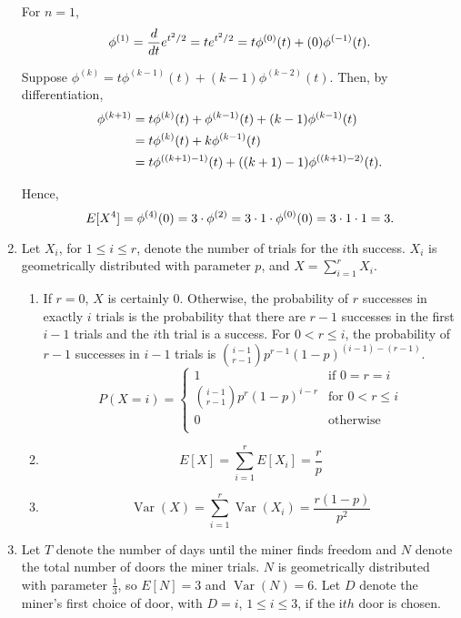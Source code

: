 \documentclass{article}
\DeclareMathOperator{\Var}{Var}
\begin{document}
\begin{enumerate}
    For $n=1$,
    \[
    \phi^{(1)} = \frac{d}{dt}e^{t^2/2} = te^{t^2/2} = t\phi^{(0)}(t) + (0)\phi^{(-1)}(t) \text.
    \]

    Suppose $\phi^{(k)} = t\phi^{(k-1)}(t) + (k-1)\phi^{(k-2)}(t)$. Then, by differentiation,
    \[\begin{split}
    \phi^{(k+1)}    & = t\phi^{(k)}(t) + \phi^{(k-1)}(t) + (k-1)\phi^{(k-1)}(t) \\
                    & = t\phi^{(k)}(t) + k\phi^{(k-1)}(t) \\
                    & = t\phi^{((k+1)-1)}(t) + ((k+1)-1)\phi^{((k+1)-2)}(t) \text. \\
    \end{split}\]

    Hence,
    \[
    E[X^4] = \phi^{(4)}(0) = 3\cdot\phi^{(2)} = 3\cdot1\cdot\phi^{(0)}(0) = 3\cdot1\cdot1 = 3 \text.
    \]
\item
    Let $X_i$, for $1 \leq i \leq r$, denote the number of trials for the $i$th success.
    $X_i$ is geometrically distributed with parameter $p$, and $X=\sum_{i=1}^r X_i$.
    \begin{enumerate}
    \item
        If $r=0$, $X$ is certainly $0$.
        Otherwise, the probability of $r$ successes in exactly $i$ trials is the probability that there are $r-1$ successes in the first $i-1$ trials and the $i$th trial is a success.
        For $0 < r \leq i$, the probability of $r-1$ successes in $i-1$ trials is $\binom{i-1}{r-1}p^{r-1}(1-p)^{(i-1)-(r-1)}$.
        \[
        P(X=i) =
        \begin{cases}
            1                               & \text{if } 0 = r = i \\
            \binom{i-1}{r-1}p^r(1-p)^{i-r}  & \text{for } 0 < r \leq i \\
            0                               & \text{otherwise} \\
        \end{cases}
        \]
    \item
        \[
        E[X] = \sum_{i=1}^r E[X_i] = \frac{r}{p}
        \]
    \item
        \[
        \Var(X) = \sum_{i=1}^r \Var(X_i) = \frac{r(1-p)}{p^2}
        \]
    \end{enumerate}
\item
    Let $T$ denote the number of days until the miner finds freedom and $N$ denote the total number of doors the miner trials. $N$ is geometrically distributed with parameter $\frac{1}{3}$, so $E[N]=3$ and $\Var(N)=6$.
    Let $D$ denote the miner's first choice of door, with $D=i$, $1 \leq i \leq 3$, if the i$th$ door is chosen.


\end{enumerate}
\end{document}
